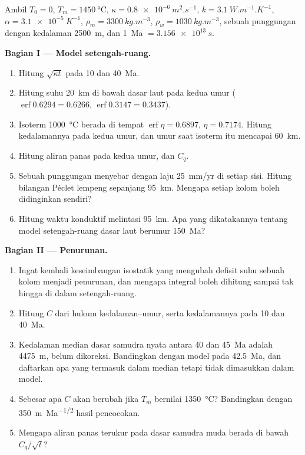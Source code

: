 \begin{problem}
\label{pb:b3:lithosphere-thermal-models:1}
Ambil $T_0 = 0$, $T_m = \qty{1450}{\celsius}$, $\kappa =
\qty{0.8e-6}{m^2.s^{-1}}$, $k = \qty{3.1}{W.m^{-1}.K^{-1}}$, $\alpha =
\qty{3.1e-5}{K^{-1}}$, $\rho_m = \qty{3300}{kg.m^{-3}}$, $\rho_w =
\qty{1030}{kg.m^{-3}}$, sebuah punggungan dengan kedalaman \qty{2500}{m}, dan \qty{1}{Ma} $=
\qty{3.156e13}{s}$.

\medskip\noindent\textbf{Bagian I --- Model setengah-ruang.}
\begin{enumerate}
  \item Hitung $\sqrt{\kappa t}$ pada 10 dan \qty{40}{Ma}.
  \item Hitung suhu \qty{20}{km} di bawah dasar laut pada kedua umur
        ($\operatorname{erf}0.6294 = 0.6266$, $\operatorname{erf}0.3147 =
        0.3437$).
  \item Isoterm \qty{1000}{\celsius} berada di tempat $\operatorname{erf}\eta =
        0.6897$, $\eta = 0.7174$. Hitung kedalamannya pada kedua umur, dan umur
        saat isoterm itu mencapai \qty{60}{km}.
  \item Hitung aliran panas pada kedua umur, dan $C_q$.
  \item Sebuah punggungan menyebar dengan laju \qty{25}{mm/yr} di setiap sisi. Hitung bilangan Péclet
        lempeng sepanjang \qty{95}{km}. Mengapa setiap kolom boleh didinginkan
        sendiri?
  \item Hitung waktu konduktif melintasi \qty{95}{km}. Apa yang dikatakannya tentang
        model setengah-ruang dasar laut berumur \qty{150}{Ma}?
\end{enumerate}

\medskip\noindent\textbf{Bagian II --- Penurunan.}
\begin{enumerate}[resume]
  \item Ingat kembali keseimbangan isostatik yang mengubah defisit suhu sebuah
        kolom menjadi penurunan, dan mengapa integral boleh dihitung sampai tak hingga
        di dalam setengah-ruang.
  \item Hitung $C$ dari hukum kedalaman--umur, serta kedalamannya pada 10 dan
        \qty{40}{Ma}.
  \item Kedalaman median dasar samudra nyata antara 40 dan \qty{45}{Ma}
        adalah \qty{4475}{m}, belum dikoreksi. Bandingkan dengan model pada
        \qty{42.5}{Ma}, dan daftarkan apa yang termasuk dalam median tetapi
        tidak dimasukkan dalam model.
  \item Sebesar apa $C$ akan berubah jika $T_m$ bernilai \qty{1350}{\celsius}?
        Bandingkan dengan \qty{350}{m.Ma^{-1/2}} hasil pencocokan.
  \item Mengapa aliran panas terukur pada dasar samudra muda berada di bawah $C_q/\sqrt t$?
\end{enumerate}


\end{problem}
